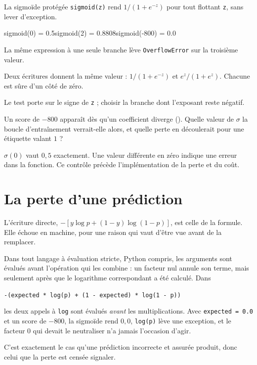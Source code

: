 \begin{tache}{La sigmoïde protégée}
 \texttt{sigmoid(z)} rend $1/(1+e^{-z})$ pour tout flottant
\texttt{z}, sans lever d'exception.

\begin{center}\ttfamily\footnotesize
sigmoid(0) = 0.5\qquad sigmoid(2) = 0.8808\qquad sigmoid(-800) = 0.0
\end{center}
La même expression à une seule branche lève \texttt{OverflowError} sur la
troisième valeur.

 Deux écritures donnent la même valeur : $1/(1+e^{-z})$ et
$e^{z}/(1+e^{z})$. Chacune est sûre d'un côté de zéro.

 Le test porte sur le signe de \texttt{z} ; choisir la branche
dont l'exposant reste négatif.

 Un score de $-800$ apparaît dès qu'un coefficient diverge
(). Quelle valeur de $\sigma$ la boucle d'entraînement
verrait-elle alors, et quelle perte en découlerait pour une étiquette valant
$1$ ?
\end{tache}

\begin{vigilance}
$\sigma(0)$ vaut $0{,}5$ exactement. Une valeur différente en zéro indique une
erreur dans la fonction. Ce contrôle précède l'implémentation de la perte et du
coût.
\end{vigilance}

\section{La perte d'une prédiction}

L'écriture directe, $-[y\log p+(1-y)\log(1-p)]$, est celle de la formule. Elle
échoue en machine, pour une raison qui vaut d'être vue avant de la remplacer.

\begin{vigilance}
Dans tout langage à évaluation stricte, Python compris, les arguments sont
évalués avant l'opération qui les combine : un facteur nul annule son terme,
mais seulement après que le logarithme correspondant a été calculé. Dans

\begin{center}
\texttt{-(expected * log(p) + (1 - expected) * log(1 - p))}
\end{center}

les deux appels à \texttt{log} sont évalués \emph{avant} les multiplications.
Avec \texttt{expected = 0.0} et un score de $-800$, la sigmoïde rend $0{,}0$,
\texttt{log(p)} lève une exception, et le facteur $0$ qui devait le neutraliser
n'a jamais l'occasion d'agir.

C'est exactement le cas qu'une prédiction incorrecte et assurée produit, donc
celui que la perte est censée signaler.
\end{vigilance}

